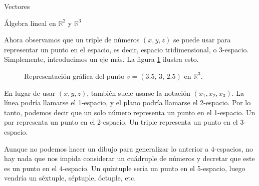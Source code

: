 \documentclass[a4paper,12pt,twoside,spanish]{amsbook}
\theoremstyle{definition}
\theoremstyle{remark}
\newcommand{\R}{\mathbb R}
\begin{document}
\begin{chapter}{Vectores}
\begin{section}{Álgebra lineal en $\R^2$ y $\R^3$}
		
		Ahora observamos que un triple de números $(x, y, z)$ se puede usar para representar un punto en el espacio, es decir, espacio tridimensional, o 3-espacio. Simplemente, introducimos un eje más. La figura \ref{fig-punto-en-R3} ilustra esto.
		\begin{figure}[h]
			\caption{Representación gráfica del punto $v = (3.5,\,3,\,2.5)$ en $\R^3$. }
			\label{fig-punto-en-R3}
		\end{figure}			
		
		En lugar de usar $(x,y,z)$, también suele usarse la notación $(x_1,x_2,x_3)$. La línea podría llamarse el 1-espacio, y el plano podría llamarse el 2-espacio. Por lo tanto, podemos decir que un solo número representa un punto en el 1-espacio. Un par representa un punto en el 2-espacio. Un triple representa un punto en el 3-espacio.
		
		Aunque no podemos hacer un dibujo para generalizar lo anterior a $4$-espacios, no hay nada que nos impida considerar un cuádruple de números y decretar que este es un punto en el $4$-espacio. Un quíntuple sería un punto en el 5-espacio, luego vendría un séxtuple, séptuple, óctuple, etc.
		

\end{section}
\end{chapter}
\end{document}
